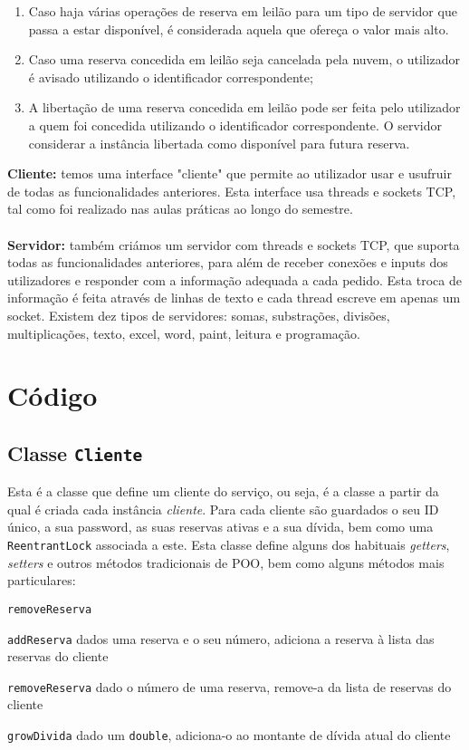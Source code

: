 \documentclass[11pt]{article}
\newcommand{\code}{\texttt}
\begin{document}
\begin{enumerate}
    \item Caso haja várias operações de reserva em leilão para um tipo de servidor que passa a estar disponível, é considerada aquela que ofereça o valor mais alto.
    \item Caso uma reserva concedida em leilão seja cancelada pela nuvem, o utilizador é avisado utilizando o identificador correspondente;
    \item A libertação de uma reserva concedida em leilão pode ser feita pelo utilizador a quem foi concedida utilizando o identificador correspondente. O servidor considerar a instância libertada como disponível para futura reserva.
\end{enumerate}

\noindent
\textbf{Cliente:} temos uma interface "cliente" que permite ao utilizador usar e usufruir de todas as funcionalidades anteriores. Esta interface usa threads e sockets TCP, tal como foi realizado nas aulas práticas ao longo do semestre.
\\
\\
\noindent
\textbf{Servidor:} também criámos um servidor com threads e sockets TCP, que suporta todas as funcionalidades anteriores, para além de receber conexões e inputs dos utilizadores e responder com a informação adequada a cada pedido. Esta troca de informação é feita através de linhas de texto e cada thread escreve em apenas um socket.
Existem dez tipos de servidores: somas, substrações, divisões, multiplicações, texto, excel, word, paint, leitura e programação.

\section{Código}

\subsection{Classe \code{Cliente}}

Esta é a classe que define um cliente do serviço, ou seja, é a classe a partir da qual é criada cada instância \emph{cliente}. Para cada cliente são guardados o seu ID único, a sua password, as suas reservas ativas e a sua dívida, bem como uma \code{ReentrantLock} associada a este. Esta classe define alguns dos habituais \emph{getters}, \emph{setters} e outros métodos tradicionais de POO, bem como alguns métodos mais particulares:

\begin{labeling}{\code{removeReserva}}
    \item [\code{addReserva}] dados uma reserva e o seu número, adiciona a reserva à lista das reservas do cliente
    \item [\code{removeReserva}] dado o número de uma reserva, remove-a da lista de reservas do cliente
    \item [\code{growDivida}] dado um \code{double}, adiciona-o ao montante de dívida atual do cliente
\end{labeling}
\end{document}
